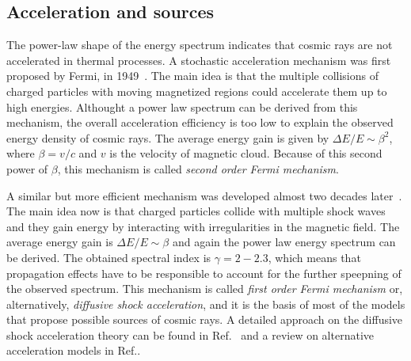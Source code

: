 \subsection{Acceleration and sources}

The power-law shape of the energy spectrum indicates that
cosmic rays are not accelerated in thermal processes.
A stochastic acceleration mechanism was first proposed
by Fermi, in 1949~\cite{Fermi:1949ee}. The main idea is that
the multiple collisions of charged particles with moving magnetized regions
could accelerate them up to high energies. 
Althought a power law spectrum can be derived from this mechanism,
the overall acceleration efficiency is too low to explain the observed
energy density of cosmic rays. The average energy gain is given by $\Delta E/E\sim \beta^2$,
where $\beta = v/c$ and $v$ is the velocity of magnetic cloud.
Because of this second power of $\beta$, this mechanism is
called \emph{second order Fermi mechanism}.

A similar but more efficient mechanism was developed almost
two decades later~\cite{Axford1977,Krymsky1977,Bell:1978zc,Blandford:1978ky}.
The main idea now is that charged particles collide with multiple shock waves
and they gain energy by interacting with irregularities in the magnetic field.
The average energy gain is $\Delta E/E\sim \beta$ and again the power law energy
spectrum can be derived. The obtained spectral index is $\gamma=2-2.3$, which means that
propagation effects have to be responsible to account for the further speepning
of the observed spectrum.
This mechanism is called \emph{first order Fermi mechanism} or, alternatively,
\emph{diffusive shock acceleration}, and it is the basis of most of the models
that propose possible sources of cosmic rays.
A detailed approach on the diffusive shock acceleration theory can be found
in Ref.~\cite{Drury:1983zz} and a review on alternative acceleration
models in Ref.\cite{}.


